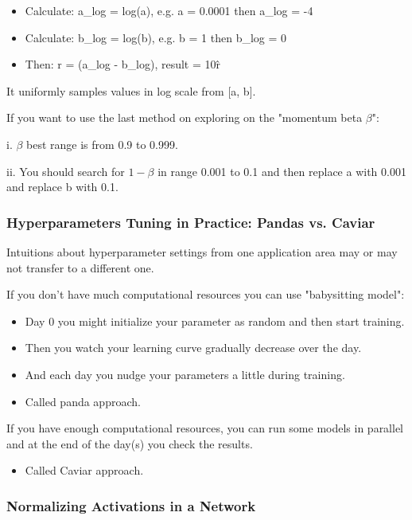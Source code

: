 \begin{itemize}
    \item Calculate: a\_log = log(a), e.g. a = 0.0001 then a\_log = -4
    \item Calculate: b\_log = log(b), e.g. b = 1 then b\_log = 0
    \item Then: r = (a\_log - b\_log), result = 10\^r
\end{itemize}

It uniformly samples values in log scale from [a, b].

If you want to use the last method on exploring on the "momentum beta $\beta$":

i. $\beta$ best range is from 0.9 to 0.999.

ii. You should search for $1-\beta$ in range 0.001 to 0.1 and then replace a with 0.001 and replace b with 0.1.

\subsubsection{Hyperparameters Tuning in Practice: Pandas vs. Caviar}
Intuitions about hyperparameter settings from one application area may or may not transfer to a different one.

If you don't have much computational resources you can use "babysitting model":
\begin{itemize}
    \item Day 0 you might initialize your parameter as random and then start training.
    \item Then you watch your learning curve gradually decrease over the day.
    \item And each day you nudge your parameters a little during training.
    \item Called panda approach.
\end{itemize}

If you have enough computational resources, you can run some models in parallel and at the end of the day(s) you check the results.

\begin{itemize}
    \item Called Caviar approach.
\end{itemize}

\subsubsection{Normalizing Activations in a Network}

